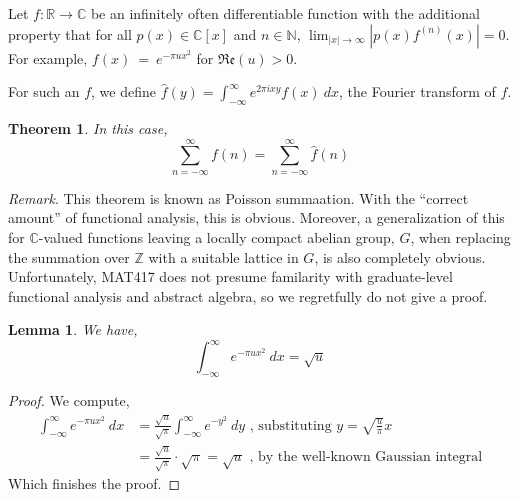 \documentclass[12pt]{article}
\newcommand{\reals}{\mathbb{R}}
\newcommand{\nats}{\mathbb{N}}
\newcommand{\ints}{\mathbb{Z}}
\newcommand{\complex}{\mathbb{C}}
\newtheorem{thm}{Theorem}
\newtheorem{lemma}{Lemma}
\numberwithin{equation}{section}
\numberwithin{thm}{section}
\numberwithin{lemma}{section}
\numberwithin{cor}{section}
\begin{document}
Let $f: \reals \to \complex$ be an infinitely often differentiable function with the additional property that for all $p(x) \in \complex[x]$ and $n \in \nats$, $\lim_{|x| \to \infty} |p(x) f^{(n)}(x)| = 0$. For example, $f(x)~=~e^{-\pi u x^2}$ for $\mathfrak{Re}(u) > 0$.

For such an $f$, we define $\hat{f}(y) = \int_{- \infty}^{\infty} e^{2\pi i xy}f(x) \ dx$, the Fourier transform of $f$.

\begin{thm}\label{PoissonSummation}
  In this case, \begin{equation*}
    \sum_{n = - \infty}^{\infty} f(n) = \sum_{n = - \infty}^{\infty} \hat{f}(n)
  \end{equation*}
\end{thm}

\textit{Remark}. This theorem is known as Poisson summaation. With the ``correct amount'' of functional analysis, this is obvious. Moreover, a generalization of this for $\complex$-valued functions leaving a locally compact abelian group, $G$, when replacing the summation over $\ints$ with a suitable lattice in $G$, is also completely obvious. Unfortunately, MAT417 does not presume familarity with graduate-level functional analysis and abstract algebra, so we regretfully do not give a proof.

\begin{lemma}\label{GaussianIntegralEvaluation}
  We have, \begin{equation*}
    \int_{- \infty}^{\infty} e^{-\pi u x^2} \ dx = \sqrt{u}
  \end{equation*}
\end{lemma}
\begin{proof}
  We compute, \begin{align*}
    \int_{-\infty}^{\infty} e^{-\pi u x^2} \ dx &= \frac{\sqrt{u}}{\sqrt{\pi}} \int_{- \infty}^{\infty} e^{-y^2} \ dy \text{ , substituting } y = \sqrt{\frac{u}{\pi}} x \\
    &= \frac{\sqrt{u}}{\sqrt{\pi}} \cdot \sqrt{\pi} = \sqrt{u} \text{ , by the well-known Gaussian integral}
  \end{align*} Which finishes the proof.
\end{proof}
\end{document}
